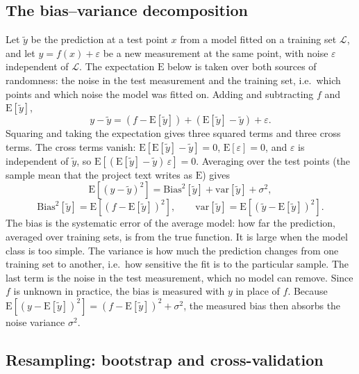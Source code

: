 \subsection{The bias--variance decomposition}\label{sec:biasvar}

Let $\tilde{y}$ be the prediction at a test point $x$ from a model fitted on a training set $\mathcal{L}$, and let $y = f(x) + \varepsilon$ be a new measurement at the same point, with noise $\varepsilon$ independent of $\mathcal{L}$. The expectation $\mathrm{E}$ below is taken over both sources of randomness: the noise in the test measurement and the training set, i.e.\ which points and which noise the model was fitted on. Adding and subtracting $f$ and $\mathrm{E}[\tilde{y}]$,
$$
y - \tilde{y} = \left(f - \mathrm{E}[\tilde{y}]\right) + \left(\mathrm{E}[\tilde{y}] - \tilde{y}\right) + \varepsilon .
$$
Squaring and taking the expectation gives three squared terms and three cross terms. The cross terms vanish: $\mathrm{E}\left[\mathrm{E}[\tilde{y}] - \tilde{y}\right] = 0$, $\mathrm{E}[\varepsilon] = 0$, and $\varepsilon$ is independent of $\tilde{y}$, so $\mathrm{E}\left[(\mathrm{E}[\tilde{y}] - \tilde{y})\,\varepsilon\right] = 0$. Averaging over the test points (the sample mean that the project text writes as $\mathrm{E}$) gives \cite[Eq.~2.52]{HjorthJensen2026}
$$
\mathrm{E}\left[(y - \tilde{y})^2\right] = \mathrm{Bias}^2[\tilde{y}] + \mathrm{var}[\tilde{y}] + \sigma^2 ,
$$
$$
\mathrm{Bias}^2[\tilde{y}] = \mathrm{E}\left[(f - \mathrm{E}[\tilde{y}])^2\right], \qquad
\mathrm{var}[\tilde{y}] = \mathrm{E}\left[(\tilde{y} - \mathrm{E}[\tilde{y}])^2\right].
$$
The bias is the systematic error of the average model: how far the prediction, averaged over training sets, is from the true function. It is large when the model class is too simple. The variance is how much the prediction changes from one training set to another, i.e.\ how sensitive the fit is to the particular sample. The last term is the noise in the test measurement, which no model can remove. Since $f$ is unknown in practice, the bias is measured with $y$ in place of $f$. Because $\mathrm{E}[(y - \mathrm{E}[\tilde{y}])^2] = (f - \mathrm{E}[\tilde{y}])^2 + \sigma^2$, the measured bias then absorbs the noise variance $\sigma^2$.

\subsection{Resampling: bootstrap and cross-validation}\label{sec:resampling}

